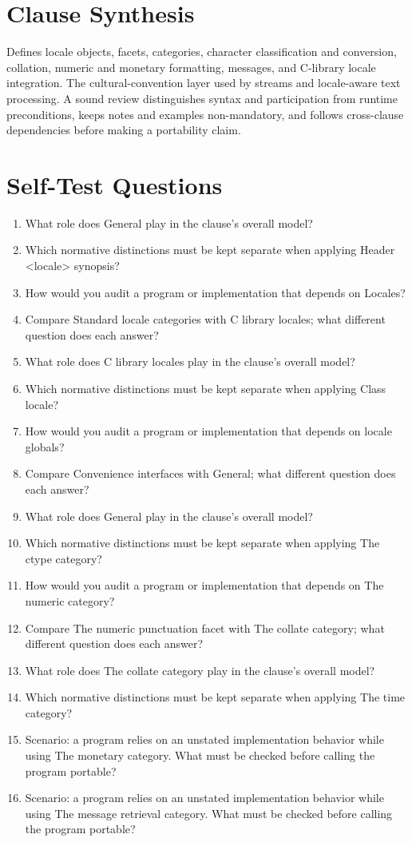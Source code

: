 \documentclass[11pt,letterpaper]{article}
\begin{document}
\section{Clause Synthesis}
\begin{CornellReferenceOrientationBox}Defines locale objects, facets, categories, character classification and conversion, collation, numeric and monetary formatting, messages, and C-library locale integration. The cultural-convention layer used by streams and locale-aware text processing. A sound review distinguishes syntax and participation from runtime preconditions, keeps notes and examples non-mandatory, and follows cross-clause dependencies before making a portability claim.\end{CornellReferenceOrientationBox}
\section{Self-Test Questions}
\begin{enumerate}
\item What role does General play in the clause's overall model?
\item Which normative distinctions must be kept separate when applying Header <locale> synopsis?
\item How would you audit a program or implementation that depends on Locales?
\item Compare Standard locale categories with C library locales; what different question does each answer?
\item What role does C library locales play in the clause's overall model?
\item Which normative distinctions must be kept separate when applying Class locale?
\item How would you audit a program or implementation that depends on locale globals?
\item Compare Convenience interfaces with General; what different question does each answer?
\item What role does General play in the clause's overall model?
\item Which normative distinctions must be kept separate when applying The ctype category?
\item How would you audit a program or implementation that depends on The numeric category?
\item Compare The numeric punctuation facet with The collate category; what different question does each answer?
\item What role does The collate category play in the clause's overall model?
\item Which normative distinctions must be kept separate when applying The time category?
\item Scenario: a program relies on an unstated implementation behavior while using The monetary category. What must be checked before calling the program portable?
\item Scenario: a program relies on an unstated implementation behavior while using The message retrieval category. What must be checked before calling the program portable?
\end{enumerate}
\end{document}
